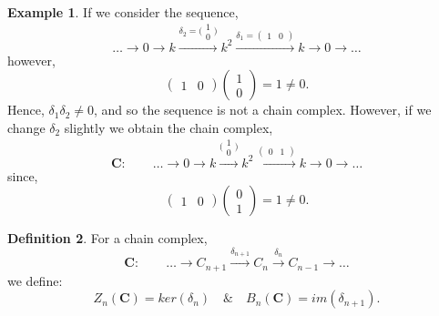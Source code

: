 \documentclass[11.5pt, twoside, a4paper, titlepage]{report}
\theoremstyle{definition}
\newtheorem{mydef}{Definition}[section]
\newtheorem{eg}[mydef]{Example}
\theoremstyle{plain}
\begin{document}
\begin{eg} \label{kchaineg}
If we consider the sequence, 
\begin{equation*} 
\dots \xrightarrow{} 0 \xrightarrow{} k \xrightarrow{\delta_2=\big(\begin{smallmatrix} 1\\ 0 \end{smallmatrix}\big)} k^2 \xrightarrow{\delta_1=(\begin{smallmatrix}1 & 0 \end{smallmatrix})} k \xrightarrow{} 0 \xrightarrow{} \dots
\end{equation*}
however,
\begin{equation*}
\begin{pmatrix}
1 & 0
\end{pmatrix}
\begin{pmatrix*}
1\\
0
\end{pmatrix*}
= 1 \neq 0.
\end{equation*}
Hence, $\delta_1\delta_2 \neq0$, and so the sequence is not a chain complex. However, if we change $\delta_2$ slightly we obtain the chain complex,
\begin{equation*}
\mathbf{C}: \qquad \dots \xrightarrow{} 0 \xrightarrow{} k \xrightarrow{\big(\begin{smallmatrix} 1\\ 0 \end{smallmatrix}\big)} k^2 \xrightarrow{(\begin{smallmatrix}0 & 1 \end{smallmatrix})} k \xrightarrow{} 0 \xrightarrow{} \dots
\end{equation*}
since, 
\begin{equation*}
\begin{pmatrix}
1 & 0
\end{pmatrix}
\begin{pmatrix*}
0\\
1
\end{pmatrix*}
= 1 \neq 0.
\end{equation*}
\end{eg}

\begin{mydef}
For a chain complex,
\begin{equation*}
\mathbf{C}: \qquad \dots \xrightarrow{} C_{n+1} \xrightarrow{\delta_{n+1 }} C_{n} \xrightarrow{\delta_{n}} C_{n-1} \xrightarrow{} \dots
\end{equation*}
we define:
\begin{equation*}
Z_n(\mathbf{C})=ker(\delta_n) \quad \& \quad B_n(\mathbf{C})=im(\delta_{n+1}).
\end{equation*}
\end{mydef}
\end{document}
